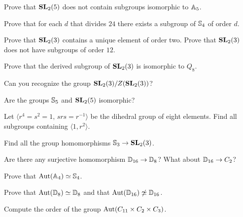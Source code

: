\begin{prob}
    Prove that $\mathbf{SL}_2(5)$ does not contain subgroups isomorphic to $\mathbb{A}_5$. 
\end{prob}

\begin{prob}
  Prove that for each $d$ that divides $24$ there exists a subgroup of $\mathbb{S}_4$ of order $d$.
\end{prob}

\begin{prob} 
  Prove that $\mathbf{SL}_2(3)$ contains a unique element of order two. Prove that
  $\mathbf{SL}_2(3)$ does not have subgroups of order $12$.
\end{prob}

\begin{prob}
  Prove that the derived subgroup of $\mathbf{SL}_2(3)$ is isomorphic to $Q_8$.
\end{prob}

\begin{prob}
  Can you recognize the group $\mathbf{SL}_2(3)/Z(\mathbf{SL}_2(3))$? 
\end{prob}

\begin{prob}
  Are the groups $\mathbb{S}_5$ and $\mathbf{SL}_2(5)$ isomorphic?
\end{prob}
%
%
\begin{prob}
  Let $\langle
  r^4=s^2=1,\,srs=r^{-1}\rangle$ be the dihedral group of eight elements. 
  Find all subgroups containing $\langle 1,r^2\rangle$.
\end{prob}

\begin{prob}
  Find all the group homomorphisms $\mathbb{S}_3\to\mathbf{SL}_2(3)$. 
\end{prob}

\begin{prob}
    Are there any surjective homomorphism $\mathbb{D}_{16}\to\mathbb{D}_{8}$? What about
    $\mathbb{D}_{16}\to C_2$?
\end{prob}

\begin{prob}
  \label{prob:Aut(A4)=S4}
   Prove that $\operatorname{Aut}(\mathbb{A}_4)\simeq\mathbb{S}_4$.
\end{prob}

\begin{prob}
  Prove that $\operatorname{Aut}(\mathbb{D}_8)\simeq\mathbb{D}_8$ and that 
  $\operatorname{Aut}(\mathbb{D}_{16})\not\simeq\mathbb{D}_{16}$.
\end{prob}

\begin{prob}
Compute the order of the group $\operatorname{Aut}(C_{11}\times C_2\times C_3)$. 
\end{prob}

